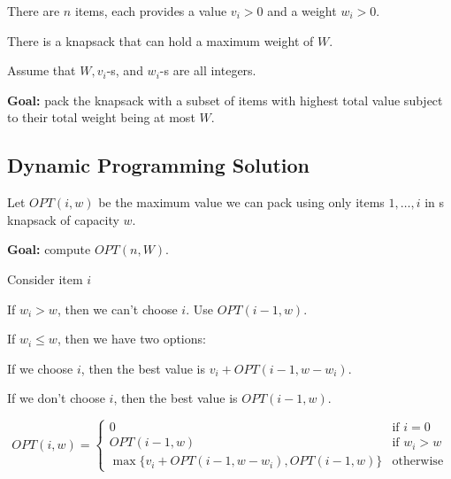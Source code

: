 \begin{listu}
    \item There are $n$ items, each provides a value $v_i > 0$ and a weight $w_i > 0$.
    \item There is a knapsack that can hold a maximum weight of $W$.
    \item Assume that $W, v_i$-s, and $w_i$-s are all integers.
    \item \textbf{Goal:} pack the knapsack with a subset of items with highest total value subject to their total weight being at most $W$. 
\end{listu}

\subsection{Dynamic Programming Solution}

\begin{listu}
    \item Let $OPT(i, w)$ be the maximum value we can pack using only items $1, \dots, i$ in s knapsack of capacity $w$.
    
    \textbf{Goal:} compute $OPT(n, W)$.

    \item Consider item $i$ 
    
    \begin{listu}
        \item If $w_i > w$, then we can't choose $i$. Use $OPT(i - 1, w)$.
        \item If $w_i \leq w$, then we have two options:
        \begin{listu}
            \item If we choose $i$, then the best value is $v_i + OPT(i - 1, w - w_i)$.
            \item If we don't choose $i$, then the best value is $OPT(i - 1, w)$.
        \end{listu}
    \end{listu}
\end{listu} 

\[
    OPT(i, w) = \begin{cases}
        0                                                & \text{if } i = 0   \\
        OPT(i - 1, w)                                    & \text{if } w_i > w \\
        \max\{v_i + OPT(i - 1, w - w_i), OPT(i - 1, w)\} & \text{otherwise}
    \end{cases}
\]

